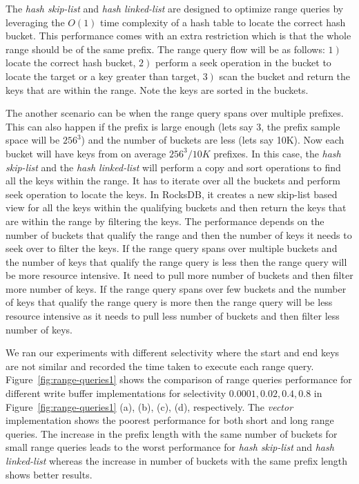The \textit{hash skip-list} and \textit{hash linked-list} are designed to optimize range queries by leveraging the $O(1)$ time complexity of a hash table to locate the correct hash bucket. 
This performance comes with an extra restriction which is that the whole range should be of the same prefix. 
The range query flow will be as follows: $\left. 1\right)$ locate the correct hash bucket, $\left. 2\right)$ perform a seek operation in the bucket to locate the target or a key greater than target, $\left. 3\right)$ scan the bucket and return the keys that are within the range. 
Note the keys are sorted in the buckets.

The another scenario can be when the range query spans over multiple prefixes.
This can also happen if the prefix is large enough (lets say 3, the prefix
sample space will be $256^3$) and the number of buckets are less (lets say
10K). Now each bucket will have keys from on average $256^3/10K$ prefixes. In
this case, the \textit{hash skip-list} and the \textit{hash linked-list} will
perform a copy and sort operations to find all the keys within the range. It
has to iterate over all the buckets and perform seek operation to locate the
keys. In RocksDB, it creates a new skip-list based view for all the keys within
the qualifying buckets and then return the keys that are within the range by
filtering the keys. The performance depends on the number of buckets that
qualify the range and then the number of keys it needs to seek over to filter
the keys. If the range query spans over multiple buckets and the number of keys
that qualify the range query is less then the range query will be more resource
intensive. It need to pull more number of buckets and then filter more number
of keys. If the range query spans over few buckets and the number of keys that
qualify the range query is more then the range query will be less resource
intensive as it needs to pull less number of buckets and then filter less
number of keys.

We ran our experiments with different selectivity where the start and end keys
are not similar and recorded the time taken to execute each range query.
Figure~\ref{fig:range-queries1} shows the comparison of range queries
performance for different write buffer implementations for selectivity $0.0001, 0.02, 0.4, 0.8$ in Figure~\ref{fig:range-queries1} (a), (b), (c), (d), respectively. The \textit{vector}
implementation shows the poorest performance for both short and long range
queries. The increase in the prefix length with the same number of buckets for
small range queries leads to the worst performance for \textit{hash skip-list}
and \textit{hash linked-list} whereas the increase in number of buckets with
the same prefix length shows better results.

